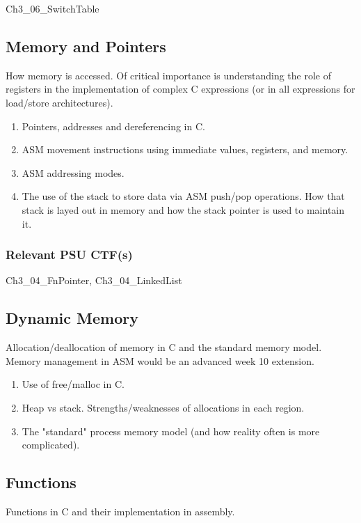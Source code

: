 \documentclass[12pt,letterpaper]{article}
\begin{document}
	Ch3\_06\_SwitchTable

	\subsection{Memory and Pointers}

	How memory is accessed. Of critical importance is understanding the role of registers in the implementation of complex C expressions (or in all expressions for load/store architectures).

	\begin{enumerate}
		\item Pointers, addresses and dereferencing in C.
		\item ASM movement instructions using immediate values, registers, and memory.
		\item ASM addressing modes.
		\item The use of the stack to store data via ASM push/pop operations. How that stack is layed out in memory and how the stack pointer is used to maintain it.
	\end{enumerate}
	
	\subsubsection*{Relevant PSU CTF(s)}

	Ch3\_04\_FnPointer, Ch3\_04\_LinkedList


	\subsection{Dynamic Memory}

	Allocation/deallocation of memory in C and the standard memory model. Memory management in ASM would be an advanced week 10 extension.

	\begin{enumerate}
		\item Use of free/malloc in C.
		\item Heap vs stack. Strengths/weaknesses of allocations in each region.
		\item The "standard" process memory model (and how reality often is more complicated).
	\end{enumerate}


	\subsection{Functions}

	Functions in C and their implementation in assembly.
\end{document}
